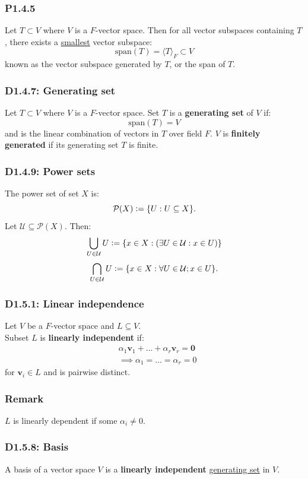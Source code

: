 \documentclass{article}
\newcommand{\deq}{\vcentcolon=}
\newcommand{\vc}[1]{\boldsymbol{#1}}
\begin{document}
\begin{multicols*}{3}
\subsubsection*{P1.4.5}
Let $T\subset V$ where $V$ is a $F$-vector space.
Then for all vector subspaces containing $T$,
there exists a \underline{smallest} vector subspace:
$$\text{span}(T)=\langle T\rangle_F\subset V$$
known as the vector subspace generated by $T$,
or the span of $T$.

\subsubsection*{D1.4.7: Generating set}
Let $T\subset V$ where $V$ is a $F$-vector space.
Set $T$ is a \textbf{generating set} of $V$ if:
$$\text{span}(T)=V$$
and is the linear combination of vectors in $T$
over field $F$. $V$ is \textbf{finitely generated}
if its generating set $T$ is finite.

\subsubsection*{D1.4.9: Power sets}
The power set of set $X$ is:
$$\mathcal{P}(X)\deq\{U:U\subseteq X\}.$$
Let $\mathcal{U}\subseteq\mathcal{P}(X)$. Then:
$$\bigcup_{U\in\mathcal{U}}U
\deq\{x\in X:(\exists U\in\mathcal{U}:x\in U)\}$$
$$\bigcap_{U\in\mathcal{U}}U
\deq\{x\in X:\forall U\in\mathcal{U};x\in U\}.$$

\subsubsection*{D1.5.1: Linear independence}
Let $V$ be a $F$-vector space and $L\subseteq V$. \\
Subset $L$ is \textbf{linearly independent} if:
\begin{align*}
    &\alpha_1\vc{v}_1+\dots+\alpha_r\vc{v}_r=\vc{0} \\
    &\implies \alpha_1=\dots=\alpha_r=0
\end{align*}
for $\vc{v}_i\in L$
and is pairwise distinct.

\subsubsection*{Remark}
$L$ is linearly dependent if some $\alpha_i\neq0$.

\subsubsection*{D1.5.8: Basis}
A basis of a vector space $V$ is a \textbf{linearly independent}
\underline{generating set} in $V$.


\end{multicols*}
\end{document}
